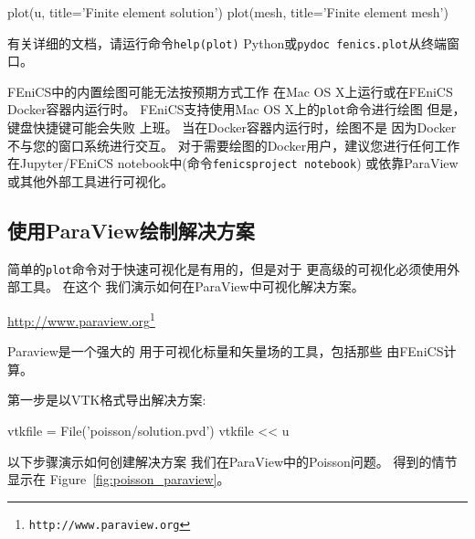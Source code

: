 \begin{python}
plot(u, title='Finite element solution')
plot(mesh, title='Finite element mesh')
\end{python}

有关详细的文档，请运行命令\texttt{help(plot)}
Python或\texttt{pydoc fenics.plot}从终端窗口。

\begin{notice}
FEniCS中的内置绘图可能无法按预期方式工作
在Mac OS X上运行或在FEniCS Docker容器内运行时。
FEniCS支持使用Mac OS X上的\texttt{plot}命令进行绘图
但是，键盘快捷键可能会失败
上班。 当在Docker容器内运行时，绘图不是
因为Docker不与您的窗口系统进行交互。
对于需要绘图的Docker用户，建议您进行任何工作
在Jupyter/FEniCS notebook中(命令\texttt{fenicsproject notebook})
或依靠ParaView或其他外部工具进行可视化。
\end{notice}

\subsection{使用ParaView绘制解决方案}


简单的\texttt{plot}命令对于快速可视化是有用的，但是对于
更高级的可视化必须使用外部工具。 在这个
我们演示如何在ParaView中可视化解决方案。
\begin{center}
  \url{http://www.paraview.org}\footnote{\texttt{http://www.paraview.org}}
\end{center}
Paraview是一个强大的
用于可视化标量和矢量场的工具，包括那些
由FEniCS计算。

第一步是以VTK格式导出解决方案:

\begin{python}
vtkfile = File('poisson/solution.pvd')
vtkfile << u
\end{python}

以下步骤演示如何创建解决方案
我们在ParaView中的Poisson问题。 得到的情节显示在
Figure~\ref{fig:poisson_paraview}。

